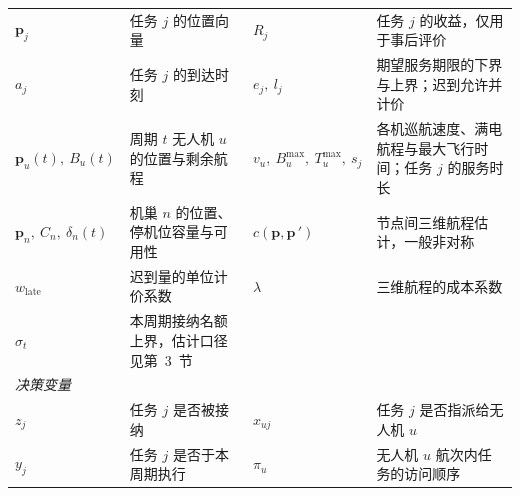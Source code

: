 \begin{table}[htbp]
\begin{tabularx}{\textwidth}{lXlX}
            $\bm{p}_j$                                                     & 任务 $j$ 的位置向量                         & $R_j$                                                                                               & 任务 $j$ 的收益，仅用于事后评价              \\
            $a_j$                                                          & 任务 $j$ 的到达时刻                         & $e_j,\ l_j$                                                                                         & 期望服务期限的下界与上界；迟到允许并计价            \\
            $\bm{p}_u(t),\ B_u(t)$                                         & 周期 $t$ 无人机 $u$ 的位置与剩余航程              & $v_u,\ B_u^{\max},\ T_u^{\max},\ s_j$                                                               & 各机巡航速度、满电航程与最大飞行时间；任务 $j$ 的服务时长 \\
            $\bm{p}_n,\ C_n,\ \delta_n(t)$                                 & 机巢 $n$ 的位置、停机位容量与可用性                 & $c(\bm{p},\bm{p}\,')$                                                                               & 节点间三维航程估计，一般非对称                 \\
            $w_{\mathrm{late}}$                                            & 迟到量的单位计价系数                           & $\lambda$                                                                                           & 三维航程的成本系数                       \\
            $\sigma_t$                                                     & 本周期接纳名额上界，估计口径见第~3~节                 &                                                                                                     &                                 \\
            \midrule
            \multicolumn{4}{l}{\emph{决策变量}}                                                                                                                                                                                                               \\
            $z_j$                                                          & 任务 $j$ 是否被接纳                         & $x_{uj}$                                                                                            & 任务 $j$ 是否指派给无人机 $u$             \\
            $y_j$                                                          & 任务 $j$ 是否于本周期执行                      & $\pi_u$                                                                                             & 无人机 $u$ 航次内任务的访问顺序              \\

\end{tabularx}
\end{table}
